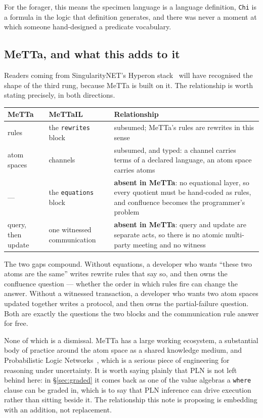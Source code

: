 For the forager, this means the specimen language is a language definition,
\texttt{Chi} is a formula in the logic that definition generates, and there was
never a moment at which someone hand-designed a predicate vocabulary.

\subsection{MeTTa, and what this adds to it}
\label{sec:metta}

Readers coming from SingularityNET's Hyperon stack~\cite{Hyperon} will have
recognised the shape of the third rung, because MeTTa is built on it. The relationship is worth
stating precisely, in both directions.

\begin{center}
\small
\begin{tabular}{@{}L{0.24\textwidth}L{0.30\textwidth}L{0.38\textwidth}@{}}
\toprule
\textbf{MeTTa} & \textbf{MeTTaIL} & \textbf{Relationship} \\
\midrule
rules &
the \texttt{rewrites} block &
subsumed; MeTTa's rules are rewrites in this sense \\[3pt]
atom spaces &
channels &
subsumed, and typed: a channel carries terms of a declared language, an
atom space carries atoms \\[3pt]
--- &
the \texttt{equations} block &
\textbf{absent in MeTTa}: no equational layer, so every quotient must be
hand-coded as rules, and confluence becomes the programmer's problem \\[3pt]
query, then update &
one witnessed communication &
\textbf{absent in MeTTa}: query and update are separate acts, so there is no
atomic multi-party meeting and no witness \\
\bottomrule
\end{tabular}
\end{center}

The two gaps compound. Without equations, a developer who wants ``these two
atoms are the same'' writes rewrite rules that say so, and then owns the
confluence question --- whether the order in which rules fire can change the
answer. Without a witnessed transaction, a developer who wants two atom spaces
updated together writes a protocol, and then owns the partial-failure question.
Both are exactly the questions the two blocks and the communication rule
answer for free.

None of which is a dismissal. MeTTa has a large working ecosystem, a substantial
body of practice around the atom space as a shared knowledge medium, and
Probabilistic Logic Networks~\cite{PLN}, which is a serious piece of engineering for
reasoning under uncertainty. It is worth saying plainly that PLN is not left
behind here: in \S\ref{sec:graded} it comes back as one of the value algebras a
\texttt{where} clause can be graded in, which is to say that PLN inference can
drive execution rather than sitting beside it. The relationship this note is
proposing is embedding with an addition, not replacement.

